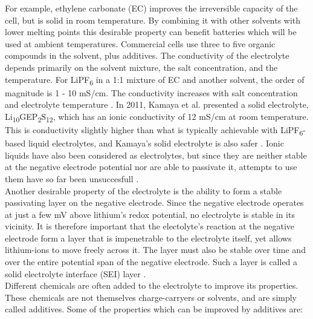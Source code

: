 \documentclass[12pt]{article} %
\begin{document}
For example, ethylene carbonate (EC) improves the irreversible capacity of the cell, but is solid in room temperature.
By combining it with other solvents with lower melting points this desirable property can benefit batteries which will be used at ambient temperatures.
Commercial cells use three to five organic compounds in the solvent, plus additives.
The conductivity of the electrolyte depends primarily on the solvent mixture, the salt concentration, and the temperature.
For LiPF\textsubscript{6} in a 1:1 mixture of EC and another solvent, the order of magnitude is 1 - 10 mS/cm.
The conductivity increases with salt concentration and electrolyte temperature \cite{reddy_thomas_section_2011-3}.
In 2011, Kamaya et al. presented a solid electrolyte, Li\textsubscript{10}GEP\textsubscript{2}S\textsubscript{12}, which has an ionic conductivity of 12 mS/cm at room temperature.
This is conductivity slightly higher than what is typically achievable with LiPF\textsubscript{6}-based liquid electrolytes, and Kamaya's solid electrolyte is also safer \cite{kamaya_lithium_2011}.
Ionic liquids have also been considered as electrolytes, but since they are neither stable at the negative electrode potential nor are able to passivate it, attempts to use them have so far been unsuccesfull \cite{blomgren_liquid_2003}.
\\
Another desirable property of the electrolyte is the ability to form a stable passivating layer on the negative electrode.
Since the negative electrode operates at just a few mV above lithium's redox potential, no electrolyte is stable in its vicinity.
It is therefore important that the electolyte's reaction at the negative electrode form a layer that is impenetrable to the electrolyte itself, yet allows lithium-ions to move freely across it.
The layer must also be stable over time and over the entire potential span of the negative electrode.
Such a layer is called a solid electrolyte interface (SEI) layer \cite{reddy_thomas_section_2011-3}.
\\
Different chemicals are often added to the electrolyte to improve its properties.
These chemicals are not themselves charge-carryers or solvents, and are simply called additives.
Some of the properties which can be improved by additives are:
\end{document}
